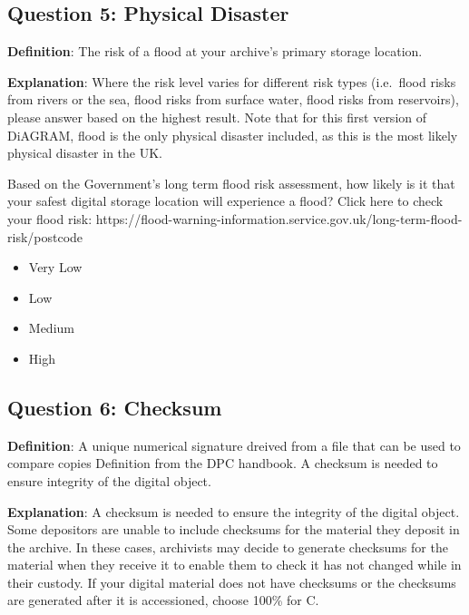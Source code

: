 \documentclass[a4paper,oneside]{article}
\providecommand{\tightlist}{%
    \setlength{\itemsep}{2pt}\setlength{\parskip}{0pt}}
\begin{document}
\begin{landscape}
\newpage

\hypertarget{question-5-physical-disaster}{%
\subsection{Question 5: Physical Disaster}\label{question-5-physical-disaster}}

\textbf{Definition}: The risk of a flood at your archive's primary storage location.

\textbf{Explanation}: Where the risk level varies for different risk types (i.e.~flood risks from rivers or the sea, flood risks from surface water, flood risks from reservoirs), please answer based on the highest result.
Note that for this first version of DiAGRAM, flood is the only physical disaster included, as this is the most likely physical disaster in the UK.

Based on the Government's long term flood risk assessment, how likely is it that your safest digital storage location will experience a flood?
Click here to check your flood risk: https://flood-warning-information.service.gov.uk/long-term-flood-risk/postcode

\begin{itemize}
\tightlist
\item
  Very Low\\
\item
  Low\\
\item
  Medium\\
\item
  High
\end{itemize}

\newpage

\hypertarget{question-6-checksum}{%
\subsection{Question 6: Checksum}\label{question-6-checksum}}

\textbf{Definition}: A unique numerical signature dreived from a file that can be used to compare copies Definition from the DPC handbook. A checksum is needed to ensure integrity of the digital object.

\textbf{Explanation}: A checksum is needed to ensure the integrity of the digital object. Some depositors are unable to include checksums for the material they deposit in the archive. In these cases, archivists may decide to generate checksums for the material when they receive it to enable them to check it has not changed while in their custody.
If your digital material does not have checksums or the checksums are generated after it is accessioned, choose 100\% for C.


\end{landscape}
\end{document}
